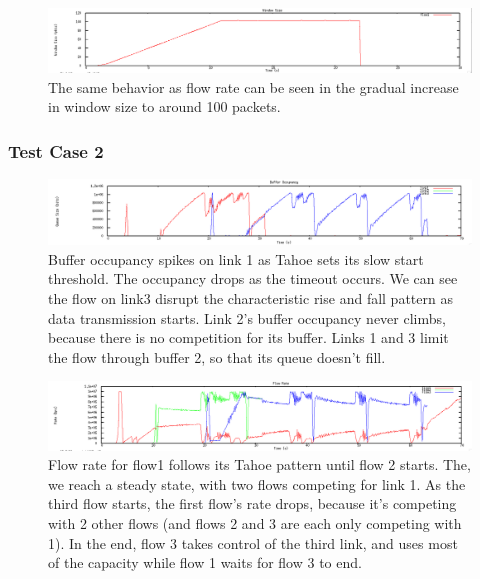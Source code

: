 \documentclass[12pt]{article}
\begin{document}
\begin{figure}[!ht]
\centering \includegraphics[bb= 0 0 1300 250, scale=.35]{figures/Test1_Vegas/window_size.png}
\caption{The same behavior as flow rate can be seen in the gradual increase in window size to around 100 packets.}
\label{fig:test1_vegas_window_size}
\end{figure}

\newpage


\subsubsection{Test Case 2}

\begin{figure}[!ht]
\centering \includegraphics[bb= 0 0 1300 250, scale=.35]{figures/Test2_Tahoe/buffer_occ.png}
\caption{Buffer occupancy spikes on link 1 as Tahoe sets its slow start threshold.  The occupancy drops as the timeout occurs.  We can see the flow on link3 disrupt the characteristic rise and fall pattern as data transmission starts.  Link 2’s buffer occupancy never climbs, because there is no competition for its buffer.  Links 1 and 3 limit the flow through buffer 2, so that its queue doesn’t fill.}
\label{fig:test2_tahoe_buffer_occ}
\end{figure}

\begin{figure}[!ht]
\centering \includegraphics[bb= 0 0 1300 250, scale=.35]{figures/Test2_Tahoe/flow_rate.png}
\caption{Flow rate for flow1 follows its Tahoe pattern until flow 2 starts.  The, we reach a steady state, with two flows competing for link 1.  As the third flow starts, the first flow’s rate drops, because it’s competing with 2 other flows (and flows 2 and 3 are each only competing with 1).  In the end, flow 3 takes control of the third link, and uses most of the capacity while flow 1 waits for flow 3 to end.}
\label{fig:test2_tahoe_flow_rate}
\end{figure}
\end{document}
